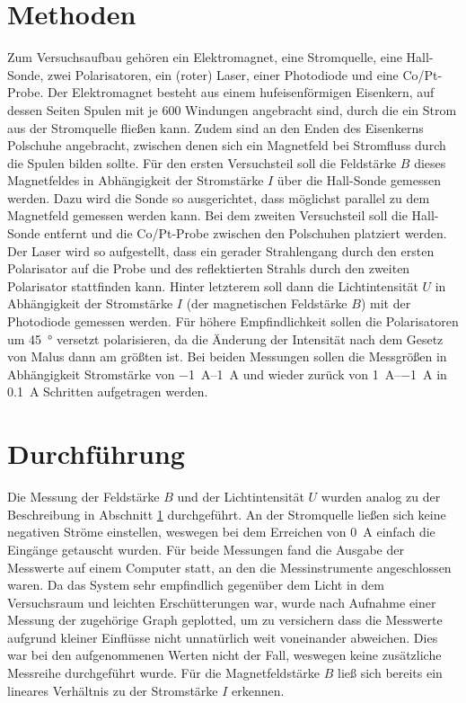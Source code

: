 \section{Methoden} \label{sec:Methoden}
			
	Zum Versuchsaufbau gehören ein Elektromagnet, eine Stromquelle, eine Hall-Sonde, zwei Polarisatoren, ein (roter) Laser, einer Photodiode und eine Co/Pt-Probe.
	Der Elektromagnet besteht aus einem hufeisenförmigen Eisenkern, auf dessen Seiten Spulen mit je 600 Windungen angebracht sind, durch die ein Strom aus der Stromquelle fließen kann. 
	Zudem sind an den Enden des Eisenkerns Polschuhe angebracht, zwischen denen sich ein Magnetfeld bei Stromfluss durch die Spulen bilden sollte.
	Für den ersten Versuchsteil soll die Feldstärke $B$ dieses Magnetfeldes in Abhängigkeit der Stromstärke $I$ über die Hall-Sonde gemessen werden.
	Dazu wird die Sonde so ausgerichtet, dass möglichst parallel zu dem Magnetfeld gemessen werden kann.
	Bei dem zweiten Versuchsteil soll die Hall-Sonde entfernt und die Co/Pt-Probe zwischen den Polschuhen platziert werden.
	Der Laser wird so aufgestellt, dass ein gerader Strahlengang durch den ersten Polarisator auf die Probe und des reflektierten Strahls durch den zweiten Polarisator stattfinden kann.
	Hinter letzterem soll dann die Lichtintensität $U$ in Abhängigkeit der Stromstärke $I$ (der magnetischen Feldstärke $B$) mit der Photodiode gemessen werden.
	Für höhere Empfindlichkeit sollen die Polarisatoren um \SI{45}{\degree} versetzt polarisieren, da die Änderung der Intensität nach dem Gesetz von Malus dann am größten ist.
	Bei beiden Messungen sollen die Messgrößen in Abhängigkeit Stromstärke von \SIrange{-1}{1}{\ampere}	und wieder zurück von \SIrange{1}{-1}{\ampere} in \SI{0,1}{\ampere} Schritten aufgetragen werden.
	
\section{Durchführung}
		
	Die Messung der Feldstärke $B$ und der Lichtintensität $U$ wurden analog zu der Beschreibung in Abschnitt \ref{sec:Methoden} durchgeführt.
	An der Stromquelle ließen sich keine negativen Ströme einstellen, weswegen bei dem Erreichen von \SI{0}{\ampere} einfach die Eingänge getauscht wurden.
	Für beide Messungen fand die Ausgabe der Messwerte auf einem Computer statt, an den die Messinstrumente angeschlossen waren.
	Da das System sehr empfindlich gegenüber dem Licht in dem Versuchsraum und leichten Erschütterungen war, wurde nach Aufnahme einer Messung der zugehörige Graph geplotted, um zu versichern dass die Messwerte aufgrund kleiner Einflüsse nicht unnatürlich weit voneinander abweichen.
	Dies war bei den aufgenommenen Werten nicht der Fall, weswegen keine zusätzliche Messreihe durchgeführt wurde. 
	Für die Magnetfeldstärke $B$ ließ sich bereits ein lineares Verhältnis zu der Stromstärke $I$ erkennen.
		

